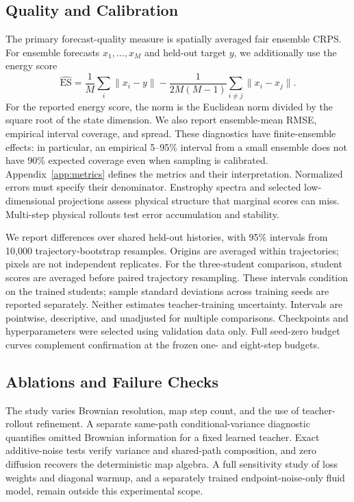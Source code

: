 \subsection{Quality and Calibration}
The primary forecast-quality measure is spatially averaged fair ensemble CRPS. For ensemble forecasts $x_1,\ldots,x_M$ and held-out target $y$, we additionally use the energy score
\begin{equation}
 \widehat{\mathrm{ES}}=
 \frac1M\sum_i\|x_i-y\|
 -\frac{1}{2M(M-1)}\sum_{i\ne j}\|x_i-x_j\|.
\end{equation}
For the reported energy score, the norm is the Euclidean norm divided by the square root of the state dimension. We also report ensemble-mean RMSE, empirical interval coverage, and spread. These diagnostics have finite-ensemble effects: in particular, an empirical 5--95\% interval from a small ensemble does not have 90\% expected coverage even when sampling is calibrated. Appendix~\ref{app:metrics} defines the metrics and their interpretation. Normalized errors must specify their denominator. Enstrophy spectra and selected low-dimensional projections assess physical structure that marginal scores can miss. Multi-step physical rollouts test error accumulation and stability.

We report differences over shared held-out histories, with 95\% intervals from 10,000 trajectory-bootstrap resamples. Origins are averaged within trajectories; pixels are not independent replicates. For the three-student comparison, student scores are averaged before paired trajectory resampling. These intervals condition on the trained students; sample standard deviations across training seeds are reported separately. Neither estimates teacher-training uncertainty. Intervals are pointwise, descriptive, and unadjusted for multiple comparisons. Checkpoints and hyperparameters were selected using validation data only. Full seed-zero budget curves complement confirmation at the frozen one- and eight-step budgets.

\subsection{Ablations and Failure Checks}
The study varies Brownian resolution, map step count, and the use of teacher-rollout refinement. A separate same-path conditional-variance diagnostic quantifies omitted Brownian information for a fixed learned teacher. Exact additive-noise tests verify variance and shared-path composition, and zero diffusion recovers the deterministic map algebra. A full sensitivity study of loss weights and diagonal warmup, and a separately trained endpoint-noise-only fluid model, remain outside this experimental scope.


